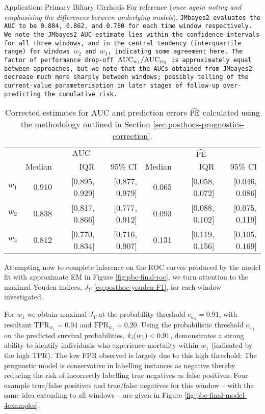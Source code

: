 \begin{chapter}{\label{cha:app-PBC}Application: Primary Biliary Cirrhosis}
  For reference (\textit{once again noting and emphasising the differences between underlying models}), \tt{JMbayes2} evaluates the AUC to be 0.884, 0.862, and 0.780 for each time window respectively. We note the \tt{JMbayes2} AUC estimate lies within the confidence intervals for all three windows, and in the central tendency (\ie interquartile range) for windows $w_2$ and $w_3$, indicating some agreement here. The factor of performance drop-off $\mathrm{AUC}_{w{_1}}/\mathrm{AUC}_{w{_3}}$ is approximately equal between approaches, but we note that the AUCs obtained from \tt{JMbayes2} decrease much more sharply between windows; possibly telling of the current-value parameterisation in later stages of follow-up over-predicting the cumulative risk.
  \begin{table}[ht]
      \centering
      \captionsetup{font=scriptsize}
      \begin{tabular}{c|rrr:rrr}
        &  & \\
        {} & Median & IQR & 95\% CI & Median & IQR & 95\% CI\\
        \hline
        $w_1$ & 0.910 & [0.895, 0.929] & [0.877, 0.979] & 0.065 & [0.058, 0.072] & [0.046, 0.086]\\
        $w_2$ & 0.838 & [0.817, 0.866] & [0.777, 0.912] & 0.093 & [0.088, 0.102] & [0.075, 0.119]\\
        $w_3$ & 0.812 & [0.770, 0.834] & [0.716, 0.907] & 0.131 & [0.119, 0.156] & [0.105, 0.169]\\
        \hline
      \end{tabular}
      \caption{Corrected estimates for $\mathrm{AUC}$ and prediction errors $\widehat{\mathrm{PE}}$ calculated using the methodology outlined in Section \ref{sec:posthocs-prognostics-correction}.}
      \label{tab:pbc-auc-PE}
  \end{table}
  
  Attempting now to complete inference on the ROC curves produced by the model fit with approximate EM in Figure \ref{fig:pbc-final-roc}, we turn attention to the maximal Youden indices, $J_Y$ \eqref{eq:posthoc-youden-F1}, for each window investigated.
  
  For $w_1$ we obtain maximal $J_Y$ at the probability threshold $c_{w{_1}}=0.91$, with resultant $\mathrm{TPR}_{w{_1}}=0.94$ and $\mathrm{FPR}_{w{_1}}=0.20$. Using the probabilistic threshold $c_{w_1}$ on the predicted survival probabilities, $\hat{\pi}_i\!\left( w_1\right)<0.91$, demonstrates a strong ability to identify individuals who experience mortality within $w_1$ (indicated by the high TPR). The low FPR observed is largely due to this high threshold: The prognostic model is conservative in labelling instances as negative thereby reducing the risk of incorrectly labelling true negatives as false positives. Four example true/false positives and true/false negatives for this window -- with the same idea extending to all windows -- are given in Figure \ref{fig:pbc-final-model-4examples}.


\end{chapter}
